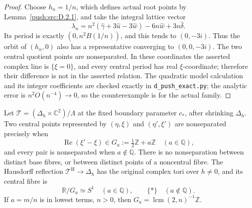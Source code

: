 \begin{proof}
Choose \(h_n=1/n\), which defines actual root points by Lemma~\ref{push:src:D.2.1},
and take the integral lattice vector
\[
 \lambda_n=n^2(\widehat\gamma+3\widehat u-3\widehat w)
            -6n\widehat w+3n\widehat\delta.
\]
Its period is exactly \((0,n^2B(1/n))\), and this tends to
\((0,-3i)\). Thus the orbit of \((h_n,0)\) also has a representative
converging to \((0,0,-3i)\). The two central quotient points are
nonseparated. In these coordinates the asserted complex line is
\(\{\xi=0\}\), and every central period has real \(\xi\)-coordinate;
therefore their difference is not in the asserted relation. The
quadratic model calculation and its integer coefficients are checked
exactly in \texttt{d\_push\_exact.py}; the analytic error is
\(n^2O(n^{-4})\to0\), so the counterexample is for the actual family.
\end{proof}

\begin{theorem}\label{push:src:D.2.3}
Let \(\mathcal T=(\Delta_h\times\mathbb C^2)/\Lambda\) at the fixed
boundary parameter \(c_*\), after shrinking \(\Delta_h\). Two
central points represented by \((\eta,\xi)\) and
\((\eta',\xi')\) are nonseparated precisely when
\[
 \operatorname{Re}(\xi'-\xi)\in G_a
       :=\tfrac12\mathbb Z+a\mathbb Z\quad(a\in\mathbb Q),
\]
and every pair is nonseparated when \(a\notin\mathbb Q\).
There is no nonseparation between distinct base fibres, or between
distinct points of a noncentral fibre. The Hausdorff reflection
\(\mathcal T^{\mathrm H}\to\Delta_h\) has the original complex tori
over \(h\ne0\), and its central fibre is
\[
 \mathbb R/G_a\simeq S^1\quad(a\in\mathbb Q),\qquad
 \{*\}\quad(a\notin\mathbb Q).
\]
If \(a=m/n\) is in lowest terms, \(n>0\), then
\(G_a=\operatorname{lcm}(2,n)^{-1}\mathbb Z\).
\end{theorem}

